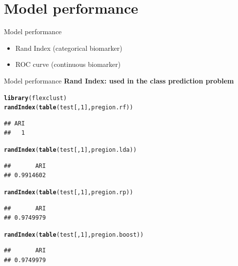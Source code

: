 \documentclass[10pt,xcolor=dvipsnames]{beamer}\usepackage[]{graphicx}\usepackage[]{color}
\makeatletter
\newcommand{\hlnum}[1]{\textcolor[rgb]{0.686,0.059,0.569}{#1}}%
\newcommand{\hlstd}[1]{\textcolor[rgb]{0.345,0.345,0.345}{#1}}%
\newcommand{\hlkwd}[1]{\textcolor[rgb]{0.737,0.353,0.396}{\textbf{#1}}}%
\newenvironment{kframe}{%
 \def\at@end@of@kframe{}%
 \ifinner\ifhmode%
  \def\at@end@of@kframe{\end{minipage}}%
  \begin{minipage}{\columnwidth}%
 \fi\fi%
 \def\FrameCommand##1{\hskip\@totalleftmargin \hskip-\fboxsep
 \colorbox{shadecolor}{##1}\hskip-\fboxsep
     \hskip-\linewidth \hskip-\@totalleftmargin \hskip\columnwidth}%
 \MakeFramed {\advance\hsize-\width
   \@totalleftmargin\z@ \linewidth\hsize
   \@setminipage}}%
 {\par\unskip\endMakeFramed%
 \at@end@of@kframe}
\newenvironment{knitrout}{}{} %
\makeatother
\begin{document}
\section{Model performance}

\begin{frame}[fragile]{Model performance}
 \begin{itemize}
   \item Rand Index (categorical biomarker)
   \item ROC curve (continuous biomarker)
 \end{itemize}
\end{frame}




\begin{frame}[fragile]{Model performance}
\textbf{Rand Index: used in the class prediction problem}
\begin{knitrout}\footnotesize
{}\color{fgcolor}\begin{kframe}
\begin{alltt}
\hlkwd{library}\hlstd{(flexclust)}
\hlkwd{randIndex}\hlstd{(}\hlkwd{table}\hlstd{(test[,}\hlnum{1}\hlstd{], pregion.rf))}
\end{alltt}
\begin{verbatim}
## ARI 
##   1
\end{verbatim}
\begin{alltt}
\hlkwd{randIndex}\hlstd{(}\hlkwd{table}\hlstd{(test[,}\hlnum{1}\hlstd{], pregion.lda))}
\end{alltt}
\begin{verbatim}
##       ARI 
## 0.9914602
\end{verbatim}
\begin{alltt}
\hlkwd{randIndex}\hlstd{(}\hlkwd{table}\hlstd{(test[,}\hlnum{1}\hlstd{], pregion.rp))}
\end{alltt}
\begin{verbatim}
##       ARI 
## 0.9749979
\end{verbatim}
\begin{alltt}
\hlkwd{randIndex}\hlstd{(}\hlkwd{table}\hlstd{(test[,}\hlnum{1}\hlstd{], pregion.boost))}
\end{alltt}
\begin{verbatim}
##       ARI 
## 0.9749979
\end{verbatim}
\end{kframe}
\end{knitrout}
\end{frame}
\end{document}
